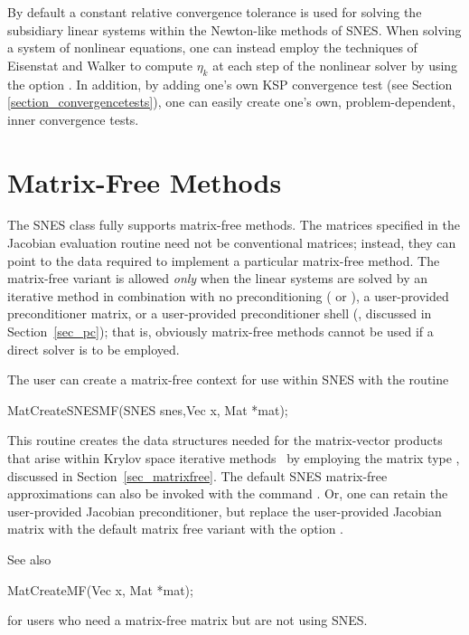 By default a constant relative convergence tolerance is used for
solving the subsidiary linear systems within the Newton-like methods
of SNES.  When solving a system of nonlinear equations, one can
instead employ the techniques of Eisenstat and Walker \cite{ew94}
to compute $ \eta_k $ at each step of the nonlinear solver by using the
option  . In addition,
by adding one's own KSP convergence test (see Section 
\ref{section_convergencetests}), one can easily create one's own,
problem-dependent, inner convergence tests. 

\section{Matrix-Free Methods}
\label{sec_nlmatrixfree}

The SNES class fully supports matrix-free methods. The matrices specified in the
Jacobian evaluation routine need not be conventional
matrices; instead, they can point to the data required to implement a
particular matrix-free method.  The matrix-free variant is allowed
{\em only} when the linear systems are solved by an iterative method
in combination with no preconditioning ( or  ),
a user-provided preconditioner matrix, or a user-provided preconditioner
shell (, discussed in Section~\ref{sec_pc}); that is,
obviously matrix-free methods cannot be used if a direct solver is to 
be employed.  

The user can create a matrix-free context for use within SNES with 
the routine
\begin{tabbing}
  MatCreateSNESMF(SNES snes,Vec x, Mat *mat);
\end{tabbing}
This routine creates the data structures needed for the matrix-vector 
products that arise within Krylov space iterative methods~\cite{brownsaad:90}
by employing the matrix type , 
discussed in Section~\ref{sec_matrixfree}.  The default SNES matrix-free
approximations can also be invoked with the command . 
Or, one can retain the user-provided Jacobian preconditioner, but replace the 
user-provided Jacobian matrix with the default matrix free variant with the
option . 

See also
\begin{tabbing}
  MatCreateMF(Vec x, Mat *mat);
\end{tabbing}
for users who need a matrix-free matrix but are not using SNES.

